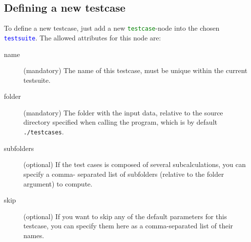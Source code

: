 \documentclass[a4paper,12pt]{scrartcl}
\newcommand{\testsuite}{\textcolor{blue}{\texttt{testsuite}}}
\newcommand{\testcase}{\textcolor{green}{\texttt{testcase}}}
\begin{document}
\subsection{Defining a new testcase}
To define a new testcase, just add a new \testcase{}-node into the chosen \testsuite{}.
The allowed attributes for this node are:
\begin{description}
    \item[name] (mandatory) The name of this testcase, must be unique within the current testsuite.
    \item[folder] (mandatory) The folder with the input data, relative to the source directory specified when
        calling the program, which is by default \texttt{./testcases}.
    \item[subfolders] (optional) If the test cases is composed of several subcalculations, you can specify a comma-
        separated list of subfolders (relative to the folder argument) to compute.
    \item[skip] (optional) If you want to skip any of the default parameters for this testcase, you can specify them
        here as a comma-separated list of their names.
\end{description}
\end{document}
